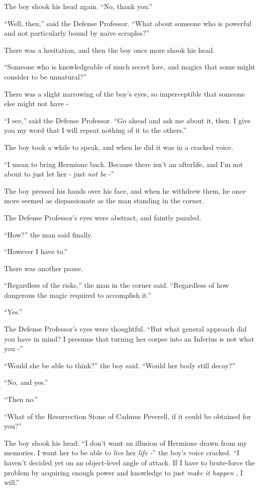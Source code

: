 The boy shook his head again. ``No, thank you.''

``Well, then,'' said the Defense Professor. ``What about someone who is
powerful and not particularly bound by naive scruples?''

There was a hesitation, and then the boy once more shook his head.

``Someone who is knowledgeable of much secret lore, and magics that some
might consider to be unnatural?''

There was a slight narrowing of the boy's eyes, so imperceptible that
someone else might not have -

``I see,'' said the Defense Professor. ``Go ahead and ask me about it,
then. I give you my word that I will repeat nothing of it to the
others.''

The boy took a while to speak, and when he did it was in a cracked
voice.

``I mean to bring Hermione back. Because there isn't an afterlife, and
I'm not about to just let her - just \emph{not be} -''

The boy pressed his hands over his face, and when he withdrew them, he
once more seemed as dispassionate as the man standing in the corner.

The Defense Professor's eyes were abstract, and faintly puzzled.

``How?'' the man said finally.

``However I have to.''

There was another pause.

``Regardless of the risks,'' the man in the corner said. ``Regardless of
how dangerous the magic required to accomplish it.''

``Yes.''

The Defense Professor's eyes were thoughtful. ``But what general
approach did you have in mind? I presume that turning her corpse into an
Inferius is not what you -''

``Would she be able to think?'' the boy said. ``Would her body still
decay?''

``No, and yes.''

``Then no.''

``What of the Resurrection Stone of Cadmus Peverell, if it could be
obtained for you?''

The boy shook his head. ``I don't want an illusion of Hermione drawn
from my memories. I want her to be able to \emph{live} her \emph{life
-}'' the boy's voice cracked. ``I haven't decided yet on an object-level
angle of attack. If I have to brute-force the problem by acquiring
enough power and knowledge to just \emph{make it happen} , I will.''

